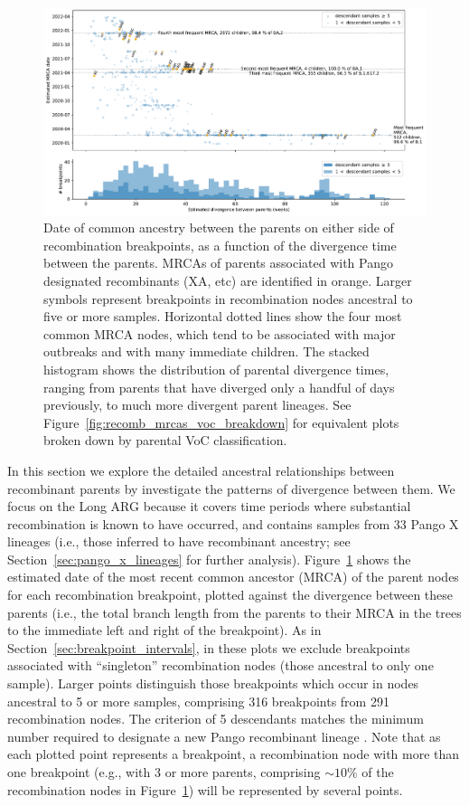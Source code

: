 \documentclass{article}
\begin{document}
\begin{figure} \centering
\includegraphics[width=\textwidth]{figures/recombination_node_mrcas.pdf}
\caption{\label{fig:recomb_mrcas}
Date of common ancestry between the parents on either side of recombination
breakpoints, as a function of the divergence time between the parents.
MRCAs of parents associated with Pango designated recombinants (XA, etc)
are identified in orange. Larger symbols represent breakpoints in recombination
nodes ancestral to five or more samples.
Horizontal dotted lines show the four most common MRCA nodes,
which tend to be associated with major outbreaks and with many immediate children.
The stacked histogram shows the distribution of parental divergence times, ranging
from parents that have diverged only a handful of days previously, to much more
divergent parent lineages. See Figure~\ref{fig:recomb_mrcas_voc_breakdown}
for equivalent plots broken down by parental VoC classification.
}
\end{figure}

In this section we explore the detailed ancestral relationships between
recombinant parents by investigate the patterns of divergence between
them.
We focus on the Long ARG because it covers time
periods where substantial recombination is known to have occurred,
and contains samples from 33 Pango X lineages (i.e., those inferred
to have recombinant ancestry; see Section~\ref{sec:pango_x_lineages} for
further analysis).
Figure~\ref{fig:recomb_mrcas} shows the estimated date of the most recent
common ancestor (MRCA) of the parent nodes for each recombination breakpoint,
plotted against the divergence between these parents (i.e., the
total branch length from the parents to their MRCA in the trees to
the immediate left and right of the breakpoint).
As in Section~\ref{sec:breakpoint_intervals}, in these plots we
exclude breakpoints associated with ``singleton'' recombination nodes
(those ancestral to only one sample).
Larger points distinguish those breakpoints which occur in nodes
ancestral to 5 or more samples, comprising 316 breakpoints from
291 recombination nodes. The criterion of 5 descendants matches the
minimum number required to designate a new Pango recombinant lineage
\citep{Rambaut2020-dw}.
Note that as each plotted point represents a breakpoint, a recombination
node with more than one breakpoint (e.g., with 3 or more parents,
comprising ${\sim}10 \%$ of the
recombination nodes in
Figure~\ref{fig:recomb_mrcas}) will be represented by several points.
\end{document}
